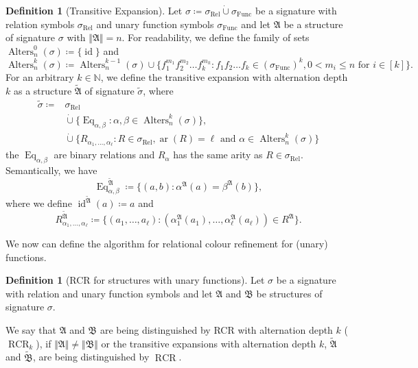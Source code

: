 \documentclass[a4paper,11pt,DIV=15]{scrartcl} %
\theoremstyle{plain}
\theoremstyle{definition}
\newtheorem{definition}[theorem]{Definition}
\newcommand{\RCR}{\operatorname{RCR}}
\begin{document}
\begin{definition}[Transitive Expansion]
	Let $\sigma\coloneqq \sigma_{\operatorname{Rel}} \operatorname{\dot{\cup}} \sigma_{\operatorname{Func}}$ be a signature with relation symbols $\sigma_{\operatorname{Rel}}$ and unary function symbols $\sigma_{\operatorname{Func}}$ and let $\mathfrak A$ be a structure of signature $\sigma$ with $\Vert \mathfrak A \Vert=n$.
	For readability, we define the family of sets $\operatorname{Alters}_n^0(\sigma)\coloneqq\{\operatorname{id}\}$ and
	$$\operatorname{Alters}^k_{n}(\sigma)\coloneqq \operatorname{Alters}^{k-1}_{n}(\sigma)\cup\{f_1^{m_1}f_2^{m_2}\dots f_k^{m_k} : f_1f_2\dots f_k\in (\sigma_{\operatorname{Func}})^k, 0 < m_i \leq n \text{ for } i \in [k]\}.$$
	For an arbitrary $k\in \mathbb{N}$, we define the transitive expansion with alternation depth $k$ as a structure $\widetilde{\mathfrak A}$ of signature $\widetilde{\sigma}$, where 
	\begin{align*}
		\widetilde{\sigma}\coloneqq &\sigma_{\operatorname{Rel}} \\
		& \operatorname{\dot{\cup}}\{\operatorname{Eq}_{\alpha,\beta}: \alpha,\beta\in\operatorname{Alters}^k_n(\sigma)\}, \\
		& \operatorname{\dot{\cup}} \{R_{\alpha_1,\dots,\alpha_\ell} : R\in \sigma_{\operatorname{Rel}},\operatorname{ar}(R)=\ell \text{ and } \alpha\in \operatorname{Alters}^k_n(\sigma)\}
	\end{align*}
	the $\operatorname{Eq}_{\alpha,\beta}$ are binary relations and $R_\alpha$ has the same arity as $R\in\sigma_{\operatorname{Rel}}$.
	Semantically, we have 
	$$\operatorname{Eq}_{\alpha,\beta}^{\widetilde{\mathfrak A}}\coloneqq \{(a,b) : \alpha^{\mathfrak A}(a)=\beta^{\mathfrak A}(b)\},$$
	where we define $\operatorname{id}^{\widetilde{\mathfrak A}}(a)\coloneqq a$ and 
	$$R_{\alpha_1,\dots,\alpha_\ell}^{\widetilde{\mathfrak A}} \coloneqq \{(a_1,\dots,a_\ell) : (\alpha_1^{\mathfrak A}(a_1),\dots,\alpha_\ell^{\mathfrak A}(a_\ell))\in R^{\mathfrak A}\}.$$
\end{definition}

We now can define the algorithm for relational colour refinement for (unary) functions.

\begin{definition}[RCR for structures with unary functions]
	Let $\sigma$ be a signature with relation and unary function symbols and let $\mathfrak A$ and $\mathfrak B$ be structures of signature $\sigma$.
	
	We say that $\mathfrak A$ and $\mathfrak B$ are being distinguished by RCR with alternation depth $k$ ($\RCR_k$), if $\Vert\mathfrak A\Vert\neq \Vert \mathfrak B\Vert$ or the transitive expansions with alternation depth $k$, $\widetilde{\mathfrak A}$ and $\widetilde{\mathfrak B}$, are being distinguished by $\RCR$.
\end{definition}
\end{document}
